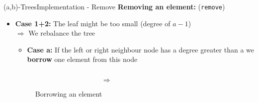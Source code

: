 
\begin{frame}{(a,b)-Trees}{Implementation - Remove}
  \textbf{Removing an element:} (\texttt{\color{Mittel-Blau}remove})
  \begin{itemize}
    \item<2->
      \textbf{Case 1+2:}
      The leaf might be too small (degree of {\color{Mittel-Blau}$a-1$})\\
      $\Rightarrow$ We {\color{Mittel-Blau}rebalance} the tree
      \vspace{0.5em}
      \begin{itemize}
        \item<3->
        \textbf{Case a:}
        If the left or right neighbour node has a degree greater than
        {\color{Mittel-Blau}a} we \textbf{borrow} one element from this node
      \end{itemize}
      \begin{figure}
        \begin{columns}
          \begin{column}{0.45\linewidth}
            \begin{adjustbox}{width=\linewidth}
              
            \end{adjustbox}
          \end{column}
          \begin{column}{0.1\linewidth}
            \begin{center}
              $\Rightarrow$
            \end{center}
          \end{column}
          \begin{column}{0.45\linewidth}
            \begin{adjustbox}{width=\linewidth}
              
            \end{adjustbox}
          \end{column}
        \end{columns}
        \caption{Borrowing an element}
        \label{fig:a_b_tree:move}
      \end{figure}
  \end{itemize}
\end{frame}


